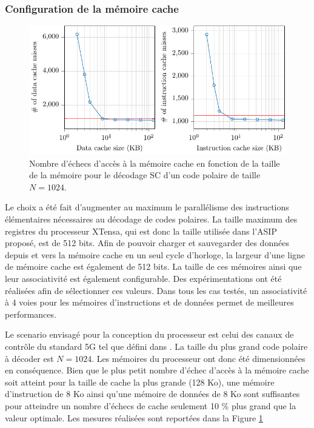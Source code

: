 \subsubsection{Configuration de la mémoire cache}
\begin{figure}
\centering
\includegraphics[width=\textwidth]{main/ch3_fig/curves/memory/tikz/memory}
\caption{Nombre d'échecs d'accès à la mémoire cache en fonction de la taille de la mémoire pour le décodage SC d'un code polaire de taille $N=1024$.}
\label{fig:tensilica_mem}
\end{figure}

Le choix a été fait d'augmenter au maximum le parallélisme des instructions élémentaires nécessaires au décodage de codes polaires. La taille maximum des registres du processeur XTensa, qui est donc la taille utilisée dans l'ASIP proposé, est de 512 bits. Afin de pouvoir charger et sauvegarder des données depuis et vers la mémoire cache en un seul cycle d'horloge, la largeur d'une ligne de mémoire cache est également de 512 bits. La taille de ces mémoires ainsi que leur associativité est également configurable. Des expérimentations ont été réalisées afin de sélectionner ces valeurs. Dans tous les cas testés, un associativité à 4 voies pour les mémoires d'instructions et de données permet de meilleures performances.

Le scenario envisagé pour la conception du processeur est celui des canaux de contrôle du standard 5G tel que défini dans \cite{3gpp_ts_2017}. La taille du plus grand code polaire à décoder est $N=1024$. Les mémoires du processeur ont donc été dimensionnées en conséquence.
Bien que le plus petit nombre d'échec d'accès à la mémoire cache soit atteint pour la taille de cache la plus grande (128 Ko), une mémoire d'instruction de 8 Ko ainsi qu'une mémoire de données de 8 Ko sont suffisantes pour atteindre un nombre d'échecs de cache seulement 10 \% plus grand que la valeur optimale. Les mesures réalisées sont reportées dans la Figure \ref{fig:tensilica_mem}

